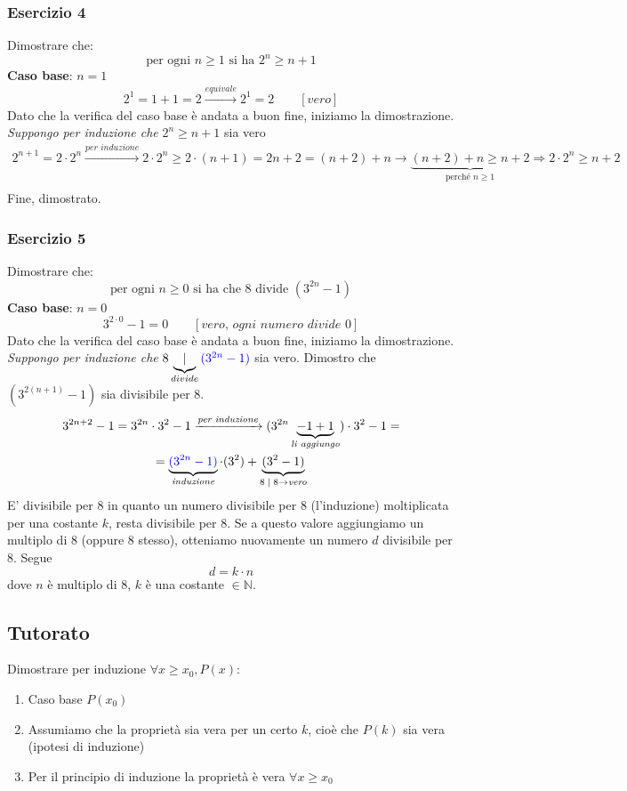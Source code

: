 \documentclass[italian]{article}
\begin{document}
\subsubsection{Esercizio 4}
Dimostrare che:
\[
	\text{per ogni } n\geq 1 \text{ si ha } 2^n \geq n+1
\]
\textbf{Caso base}: $n=1$\\
\[
	2^1 = 1 +1 = 2 \xrightarrow{equivale} 2^1=2 \qquad [\textit{vero}]
\]
Dato che la verifica del caso base è andata a buon fine, iniziamo la dimostrazione.\\
\textit{Suppongo per induzione che} $2^n \geq n+1$ sia vero
\begin{gather*}
	2^{n+1}=2\cdot2^n \xrightarrow{\textit{per induzione}} 2\cdot 2^n \geq 2\cdot (n+1) = 2n + 2 = (n+2)+n \to \underbrace{(n+2)+n \geq n+2}_{\text{perché } n \geq 1} \Rightarrow 2\cdot 2^n \geq n+2 \\
\end{gather*}
Fine, dimostrato.

\subsubsection{Esercizio 5}
Dimostrare che:
\[
\text{per ogni } n\geq 0 \text{ si ha che } 8 \text{ divide } (3^{2n}-1)
\]
\textbf{Caso base}: $n=0$\\
\[
3^{2\cdot 0} -1 = 0 \qquad [\textit{vero, ogni numero divide 0}]
\]
Dato che la verifica del caso base è andata a buon fine, iniziamo la dimostrazione.\\
\textit{Suppongo per induzione che} $8 \underbrace{|}_{divide} \textcolor{blue}{(3^{2n} - 1)}$ sia vero. Dimostro che $(3^{2(n+1)} - 1)$ sia divisibile per 8.
\begin{gather*}
	3^{2n+2} - 1 = 3^{2n}\cdot 3^2 - 1 \xrightarrow{\textit{per induzione}} (3^{2n}\underbrace{-1+1}_{\textit{li aggiungo}})\cdot 3^2 - 1 = \\
	= \underbrace{\textcolor{blue}{(3^{2n}-1)}}_{\textit{induzione}}\cdot (3^2)+\underbrace{(3^2-1)}_{8 \; | \; 8 \to \textit{vero}}
\end{gather*}
E' divisibile per 8 in quanto un numero divisibile per 8 (l'induzione) moltiplicata per una costante $k$, resta divisibile per 8. Se a questo valore aggiungiamo un multiplo di 8 (oppure 8 stesso), otteniamo nuovamente un numero $d$ divisibile per 8. Segue
\[
	d=k\cdot n
\]
dove $n$ è multiplo di 8, $k$ è una costante $\in \mathbb{N}$.
\pagebreak
\subsection{Tutorato}
Dimostrare per induzione $\forall x \geq x_0, P(x)$:
\begin{enumerate}
	\item Caso base $P(x_0)$
	\item Assumiamo che la proprietà sia vera per un certo $k$, cioè che $P(k)$ sia vera (ipotesi di induzione)
	\item Per il principio di induzione la proprietà è vera $\forall x \geq x_0$
\end{enumerate}
\end{document}
